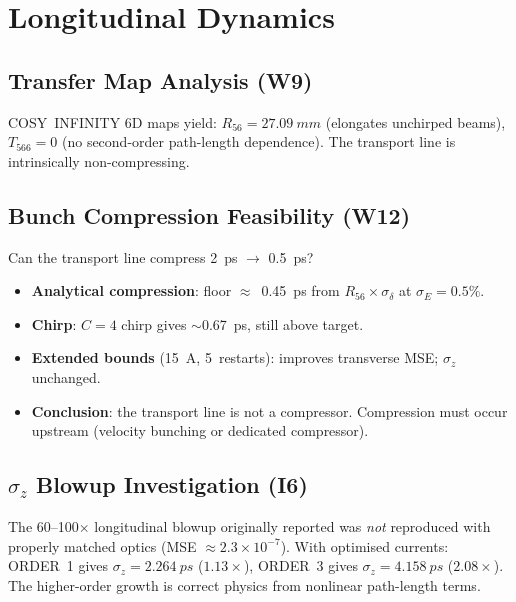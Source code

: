 \documentclass[11pt]{article}
\begin{document}
\section{Longitudinal Dynamics}
\label{sec:longitudinal}

\subsection{Transfer Map Analysis (W9)}

COSY~INFINITY 6D maps yield:
$R_{56} = \SI{+27.09}{mm}$ (elongates unchirped beams),
$T_{566} = 0$ (no second-order path-length dependence).
The transport line is intrinsically non-compressing.

\subsection{Bunch Compression Feasibility (W12)}

Can the transport line compress 2~ps $\to$ 0.5~ps?
\begin{itemize}[nosep]
  \item \textbf{Analytical compression}: floor $\approx$~\SI{0.45}{ps}
    from $R_{56} \times \sigma_\delta$ at $\sigma_E = 0.5\%$.
  \item \textbf{Chirp}: $C = 4$ chirp gives $\sim$\SI{0.67}{ps}, still
    above target.
  \item \textbf{Extended bounds} (15~A, 5~restarts): improves transverse
    MSE; $\sigma_z$ unchanged.
  \item \textbf{Conclusion}: the transport line is not a compressor.
    Compression must occur upstream (velocity bunching or dedicated
    compressor).
\end{itemize}

\subsection{$\sigma_z$ Blowup Investigation (I6)}

The 60--100$\times$ longitudinal blowup originally reported was
\emph{not} reproduced with properly matched optics (MSE $\approx 2.3
\times 10^{-7}$).  With optimised currents: ORDER~1 gives $\sigma_z =
\SI{2.264}{ps}$ ($1.13\times$), ORDER~3 gives $\sigma_z =
\SI{4.158}{ps}$ ($2.08\times$).  The higher-order growth is correct
physics from nonlinear path-length terms.
\end{document}

